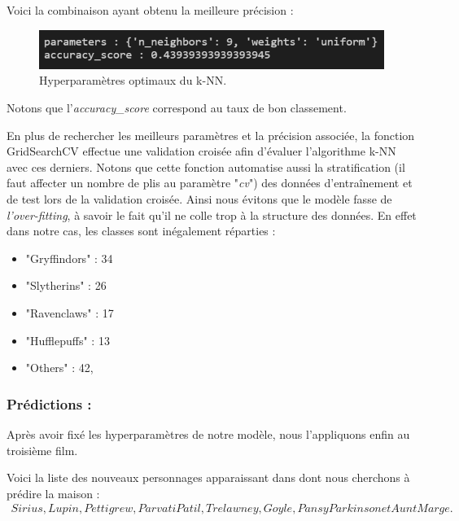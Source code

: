 \documentclass[11pt]{article}
\begin{document}
\begin{center}
\newpage

Voici la combinaison ayant obtenu la meilleure précision :

\begin{figure}[hbt!]
    \centering
    \includegraphics[width = 14 cm]{./figures/kNN_grid1.png}
    \caption{Hyperparamètres optimaux du k-NN.}
    \label{param_knn1}
\end{figure}
\FloatBarrier
Notons que l'\textit{accuracy\_score} correspond au taux de bon classement.

En plus de rechercher les meilleurs paramètres et la précision associée, la fonction GridSearchCV effectue une validation croisée afin d'évaluer l'algorithme k-NN avec ces derniers.
Notons que cette fonction automatise aussi la stratification (il faut affecter un nombre de plis au paramètre "\textit{cv}") des données d'entraînement et de test lors de la validation croisée.
Ainsi nous évitons que le modèle fasse de \textit{l'over-fitting}, à savoir le fait qu'il ne colle trop à la structure des données. En effet dans notre cas, les classes sont inégalement réparties :

    \begin{itemize}
        \item "Gryffindors" : 34
        \item "Slytherins" : 26
        \item "Ravenclaws" : 17
        \item "Hufflepuffs" : 13
        \item "Others" : 42,
    \end{itemize}

\subsubsection{Prédictions :}

Après avoir fixé les hyperparamètres de notre modèle, nous l'appliquons enfin au troisième film.\par
Voici la liste des nouveaux personnages apparaissant dans  dont nous cherchons à prédire la maison :
    \begin{align*}
        Sirius, Lupin, Pettigrew, Parvati Patil, Trelawney, Goyle, Pansy Parkinson et Aunt Marge.
    \end{align*}


\end{center}
\end{document}
